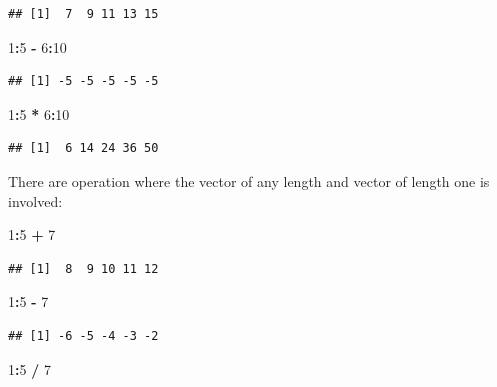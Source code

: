\documentclass[
]{book}
\newenvironment{Shaded}{\begin{snugshade}}{\end{snugshade}}
\newcommand{\DecValTok}[1]{\textcolor[rgb]{0.00,0.00,0.81}{#1}}
\newcommand{\OperatorTok}[1]{\textcolor[rgb]{0.81,0.36,0.00}{\textbf{#1}}}
\newcommand{\StringTok}[1]{\textcolor[rgb]{0.31,0.60,0.02}{#1}}
\begin{document}
\begin{verbatim}
## [1]  7  9 11 13 15
\end{verbatim}

\begin{Shaded}
\begin{Highlighting}[]
\DecValTok{1}\OperatorTok{:}\DecValTok{5} \OperatorTok{-}\StringTok{ }\DecValTok{6}\OperatorTok{:}\DecValTok{10}
\end{Highlighting}
\end{Shaded}

\begin{verbatim}
## [1] -5 -5 -5 -5 -5
\end{verbatim}

\begin{Shaded}
\begin{Highlighting}[]
\DecValTok{1}\OperatorTok{:}\DecValTok{5} \OperatorTok{*}\StringTok{ }\DecValTok{6}\OperatorTok{:}\DecValTok{10}
\end{Highlighting}
\end{Shaded}

\begin{verbatim}
## [1]  6 14 24 36 50
\end{verbatim}

There are operation where the vector of any length and vector of length one is involved:

\begin{Shaded}
\begin{Highlighting}[]
\DecValTok{1}\OperatorTok{:}\DecValTok{5} \OperatorTok{+}\StringTok{ }\DecValTok{7}
\end{Highlighting}
\end{Shaded}

\begin{verbatim}
## [1]  8  9 10 11 12
\end{verbatim}

\begin{Shaded}
\begin{Highlighting}[]
\DecValTok{1}\OperatorTok{:}\DecValTok{5} \OperatorTok{-}\StringTok{ }\DecValTok{7}
\end{Highlighting}
\end{Shaded}

\begin{verbatim}
## [1] -6 -5 -4 -3 -2
\end{verbatim}

\begin{Shaded}
\begin{Highlighting}[]
\DecValTok{1}\OperatorTok{:}\DecValTok{5} \OperatorTok{/}\StringTok{ }\DecValTok{7}
\end{Highlighting}
\end{Shaded}
\end{document}
